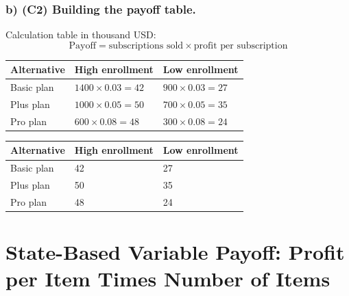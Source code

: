 	
	\subsubsection*{b) \textbf{(C2)} Building the payoff table.}
	\label{subsec:problem5-rural-internet-subscriptions-c2}
	Calculation table in thousand USD:
	\[
	\text{Payoff}=\text{subscriptions sold}\times\text{profit per subscription}
	\]
	\begin{center}
		\begin{tabular}{lll}
			\toprule
			Alternative & High enrollment & Low enrollment \\
			\midrule
			Basic plan & $1400 \times 0.03 = 42$ & $900 \times 0.03 = 27$ \\
			Plus plan & $1000 \times 0.05 = 50$ & $700 \times 0.05 = 35$ \\
			Pro plan & $600 \times 0.08 = 48$ & $300 \times 0.08 = 24$ \\
			\bottomrule
		\end{tabular}
	\end{center}
	
	\begin{center}
		\begin{tabular}{lll}
			\toprule
			Alternative & High enrollment & Low enrollment \\
			\midrule
			Basic plan & 42 & 27 \\
			Plus plan & 50 & 35 \\
			Pro plan & 48 & 24 \\
			\bottomrule
		\end{tabular}
	\end{center}
	
	
	\section{State-Based Variable Payoff: Profit per Item Times Number of Items}
	\label{sec:state-based-variable-payoff-profit-per-item-times-number-of-items}
	
	
